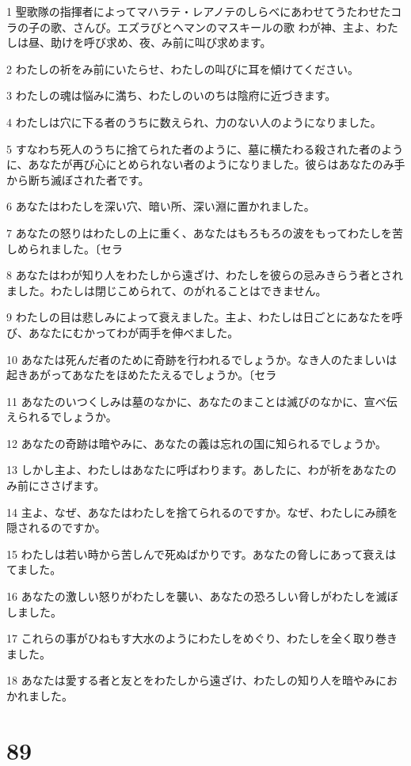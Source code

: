 \par 1 聖歌隊の指揮者によってマハラテ・レアノテのしらべにあわせてうたわせたコラの子の歌、さんび。エズラびとヘマンのマスキールの歌 わが神、主よ、わたしは昼、助けを呼び求め、夜、み前に叫び求めます。
\par 2 わたしの祈をみ前にいたらせ、わたしの叫びに耳を傾けてください。
\par 3 わたしの魂は悩みに満ち、わたしのいのちは陰府に近づきます。
\par 4 わたしは穴に下る者のうちに数えられ、力のない人のようになりました。
\par 5 すなわち死人のうちに捨てられた者のように、墓に横たわる殺された者のように、あなたが再び心にとめられない者のようになりました。彼らはあなたのみ手から断ち滅ぼされた者です。
\par 6 あなたはわたしを深い穴、暗い所、深い淵に置かれました。
\par 7 あなたの怒りはわたしの上に重く、あなたはもろもろの波をもってわたしを苦しめられました。〔セラ
\par 8 あなたはわが知り人をわたしから遠ざけ、わたしを彼らの忌みきらう者とされました。わたしは閉じこめられて、のがれることはできません。
\par 9 わたしの目は悲しみによって衰えました。主よ、わたしは日ごとにあなたを呼び、あなたにむかってわが両手を伸べました。
\par 10 あなたは死んだ者のために奇跡を行われるでしょうか。なき人のたましいは起きあがってあなたをほめたたえるでしょうか。〔セラ
\par 11 あなたのいつくしみは墓のなかに、あなたのまことは滅びのなかに、宣べ伝えられるでしょうか。
\par 12 あなたの奇跡は暗やみに、あなたの義は忘れの国に知られるでしょうか。
\par 13 しかし主よ、わたしはあなたに呼ばわります。あしたに、わが祈をあなたのみ前にささげます。
\par 14 主よ、なぜ、あなたはわたしを捨てられるのですか。なぜ、わたしにみ顔を隠されるのですか。
\par 15 わたしは若い時から苦しんで死ぬばかりです。あなたの脅しにあって衰えはてました。
\par 16 あなたの激しい怒りがわたしを襲い、あなたの恐ろしい脅しがわたしを滅ぼしました。
\par 17 これらの事がひねもす大水のようにわたしをめぐり、わたしを全く取り巻きました。
\par 18 あなたは愛する者と友とをわたしから遠ざけ、わたしの知り人を暗やみにおかれました。

\chapter{89}

